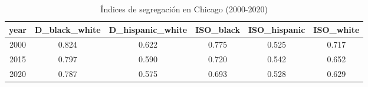 \begin{table}[ht]
\centering
\caption{Índices de segregación en Chicago (2000-2020)} 
\label{tab:indices}
\begin{tabular}{cccccc}
  \toprule
year & D\_black\_white & D\_hispanic\_white & ISO\_black & ISO\_hispanic & ISO\_white \\ 
  \midrule
2000 & 0.824 & 0.622 & 0.775 & 0.525 & 0.717 \\ 
  2015 & 0.797 & 0.590 & 0.720 & 0.542 & 0.652 \\ 
  2020 & 0.787 & 0.575 & 0.693 & 0.528 & 0.629 \\ 
   \bottomrule
\end{tabular}
\end{table}
